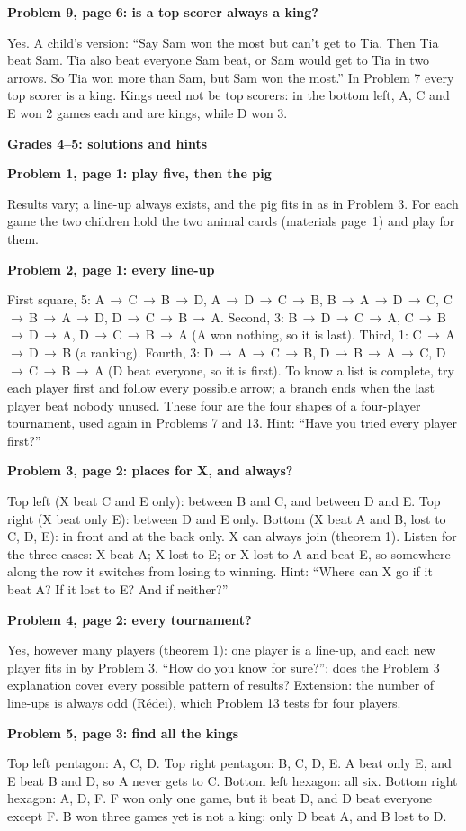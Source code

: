 \documentclass[11pt]{article}
\newcommand{\head}[1]{\par\needspace{6\baselineskip}\vspace{2pt}\textbf{\large #1}\par}
\newcommand{\sub}[1]{\par\needspace{3\baselineskip}\textbf{#1}\par}
\newcommand{\bt}{\,$\to$\,\allowbreak}
\begin{document}
\sub{Problem 9, page 6: is a top scorer always a king?}
Yes. A child's version: ``Say Sam won the most but can't get to Tia. Then Tia beat Sam. Tia also beat everyone Sam beat, or Sam would get to Tia in two arrows. So Tia won more than Sam, but Sam won the most.'' In Problem 7 every top scorer is a king. Kings need not be top scorers: in the bottom left, A, C and E won 2 games each and are kings, while D won 3.
\head{Grades 4--5: solutions and hints}
\sub{Problem 1, page 1: play five, then the pig}
Results vary; a line-up always exists, and the pig fits in as in Problem 3. For each game the two children hold the two animal cards (materials page~1) and play for them.

\sub{Problem 2, page 1: every line-up}
First square, 5: A\bt C\bt B\bt D, A\bt D\bt C\bt B, B\bt A\bt D\bt C, C\bt B\bt A\bt D, D\bt C\bt B\bt A. Second, 3: B\bt D\bt C\bt A, C\bt B\bt D\bt A, D\bt C\bt B\bt A (A won nothing, so it is last). Third, 1: C\bt A\bt D\bt B (a ranking). Fourth, 3: D\bt A\bt C\bt B, D\bt B\bt A\bt C, D\bt C\bt B\bt A (D beat everyone, so it is first). To know a list is complete, try each player first and follow every possible arrow; a branch ends when the last player beat nobody unused. These four are the four shapes of a four-player tournament, used again in Problems 7 and 13. Hint: ``Have you tried every player first?''

\sub{Problem 3, page 2: places for X, and always?}
Top left (X beat C and E only): between B and C, and between D and E. Top right (X beat only E): between D and E only. Bottom (X beat A and B, lost to C, D, E): in front and at the back only. X can always join (theorem 1). Listen for the three cases: X beat A; X lost to E; or X lost to A and beat E, so somewhere along the row it switches from losing to winning. Hint: ``Where can X go if it beat A? If it lost to E? And if neither?''

\sub{Problem 4, page 2: every tournament?}
Yes, however many players (theorem 1): one player is a line-up, and each new player fits in by Problem 3. ``How do you know for sure?'': does the Problem 3 explanation cover every possible pattern of results? Extension: the number of line-ups is always odd (R\'edei), which Problem 13 tests for four players.

\sub{Problem 5, page 3: find all the kings}
Top left pentagon: A, C, D. Top right pentagon: B, C, D, E. A beat only E, and E beat B and D, so A never gets to C. Bottom left hexagon: all six. Bottom right hexagon: A, D, F. F won only one game, but it beat D, and D beat everyone except F. B won three games yet is not a king: only D beat A, and B lost to D.
\end{document}
